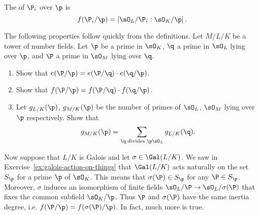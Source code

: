 \begin{definition}
  The 
  of $\P_i$ over $\p$ is
  \[
    f(\P_i/\p) = \left[\sO_L/\P_i : \sO_K/\p\right].
  \]
\end{definition}

\begin{exercise}\label{ex:ramificationmultiplicative}
  The following properties follow quickly from the definitions.
  Let $M/L/K$ be a tower of number fields. Let $\p$ be a prime
  in $\sO_K$, $\q$ a prime in $\sO_L$ lying over $\p$, and $\P$ a prime
  in $\sO_M$ lying over $\q$.
  \begin{enumerate}[label=(\alph*)]
    \item Show that $e(\P/\p)=e(\P/\q) \cdot e(\q/\p)$.
    \item Show that $f(\P/\p)=f(\P/\q) \cdot f(\q/\p)$.
    \item Let $g_{L/K}(\p)$, $g_{M/K}(\p)$ be the number of primes
          of $\sO_L$, $\sO_M$ lying over $\p$ respectively. Show that
          \[
            g_{M/K}(\p) = \sum\limits_{\q \text{ divides } \p\sO_L} g_{L/K}(\q).
          \]
  \end{enumerate}
\end{exercise}

Now suppose that $L/K$ is Galois and let $\sigma\in\Gal(L/K)$.
We saw in Exercise~\ref{ex:galois-action-on-things} that $\Gal(L/K)$ acts
naturally on the set $S_\p$ for a prime $\p$ of $\sO_K$.
This means that $\sigma(\P) \in S_\p$ for any $\P \in S_\p$. Moreover,
$\sigma$ induces an isomorphism of finite fields $\sO_L/\P\to \sO_L/\sigma(\P)$
that fixes the common subfield $\sO_K/\p$. Thus $\P$ and $\sigma(\P)$ have
the same inertia degree, i.e. $f(\P/\p) = f(\sigma(\P)/\p)$.
In fact, much more is true.

